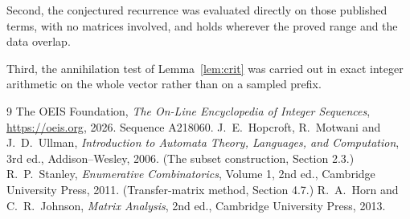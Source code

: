 \documentclass[11pt,a4paper]{article}
\theoremstyle{plain}
\theoremstyle{definition}
\begin{document}
Second, the conjectured recurrence was evaluated directly on those published terms, with no
matrices involved, and holds wherever the proved range and the data overlap.

Third, the annihilation test of Lemma~\ref{lem:crit} was carried out in exact integer
arithmetic on the whole vector rather than on a sampled prefix.

\begin{thebibliography}{9}
 The OEIS Foundation, \emph{The On-Line Encyclopedia of Integer
Sequences}, \url{https://oeis.org}, 2026. Sequence A218060.
 J.~E.~Hopcroft, R.~Motwani and J.~D.~Ullman, \emph{Introduction to Automata
Theory, Languages, and Computation}, 3rd ed., Addison--Wesley, 2006. (The subset
construction, Section 2.3.)
 R.~P.~Stanley, \emph{Enumerative Combinatorics}, Volume 1, 2nd ed.,
Cambridge University Press, 2011. (Transfer-matrix method, Section 4.7.)
 R.~A.~Horn and C.~R.~Johnson, \emph{Matrix Analysis}, 2nd ed., Cambridge
University Press, 2013.
\end{thebibliography}
\end{document}
